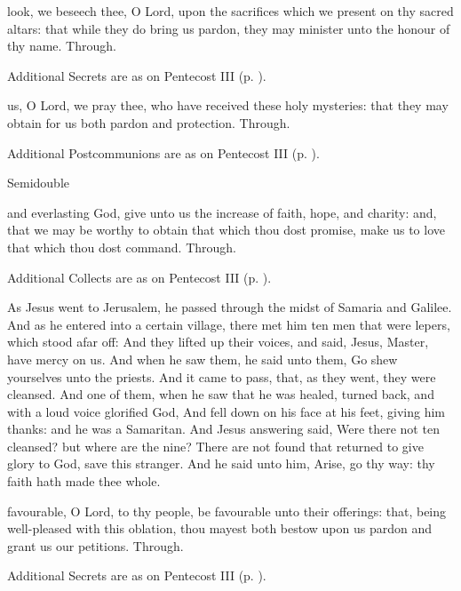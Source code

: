 \secret
{} look, we beseech thee, O Lord, upon the sacrifices which we present on thy sacred altars: that while they do bring us pardon, they may minister unto the honour of thy name. Through.
\begin{rubric}
    Additional Secrets are as on Pentecost III (p. \pageref{PentecostIII}).
\end{rubric}

\postcommunion
{} us, O Lord, we pray thee, who have received these holy mysteries: that they may obtain for us both pardon and protection. Through.
\begin{rubric}
    Additional Postcommunions are as on Pentecost III (p. \pageref{PentecostIII}).
\end{rubric}

\begin{inhead}
{Semidouble}
\end{inhead}

\collect
{} and everlasting God, give unto us the increase of faith, hope, and charity: and, that we may be worthy to obtain that which thou dost promise, make us to love that which thou dost command. Through.
\begin{rubric}
    Additional Collects are as on Pentecost III (p. \pageref{PentecostIII}).
\end{rubric}

 As Jesus went to Jerusalem, he passed through the midst of Samaria and Galilee. And as he entered into a certain village, there met him ten men that were lepers, which stood afar off: And they lifted up their voices, and said, Jesus, Master, have mercy on us. And when he saw them, he said unto them, Go shew yourselves unto the priests. And it came to pass, that, as they went, they were cleansed. And one of them, when he saw that he was healed, turned back, and with a loud voice glorified God, And fell down on his face at his feet, giving him thanks: and he was a Samaritan. And Jesus answering said, Were there not ten cleansed? but where are the nine? There are not found that returned to give glory to God, save this stranger. And he said unto him, Arise, go thy way: thy faith hath made thee whole.

\secret
{} favourable, O Lord, to thy people, be favourable unto their offerings: that, being well-pleased with this oblation, thou mayest both bestow upon us pardon and grant us our petitions. Through.
\begin{rubric}
    Additional Secrets are as on Pentecost III (p. \pageref{PentecostIII}).
\end{rubric}

